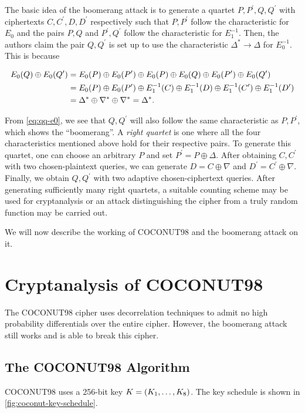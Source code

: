 \documentclass[twoside]{article}
\begin{document}
The basic idea of the boomerang attack is to generate a quartet \(P, P^\prime,
Q, Q^\prime\) with ciphertexts \(C, C^\prime, D, D^\prime\) respectively such
that \(P, P^\prime\) follow the characteristic for \(E_0\) and the pairs \(P,
Q\) and \(P^\prime, Q^\prime\) follow the characteristic for \(E_1^{-1}\). Then,
the authors claim the pair \(Q, Q^\prime\) is set up to use the characteristic
\(\Delta^* \rightarrow \Delta\) for \(E_0^{-1}\). This is because

\begin{align}
    E_0(Q) \oplus E_0(Q^\prime) &= E_0(P) \oplus E_0(P^\prime) \oplus E_0(P) \oplus E_0(Q) \oplus E_0(P^\prime) \oplus E_0(Q^\prime) \\
    &= E_0(P) \oplus E_0(P^\prime) \oplus E_1^{-1}(C) \oplus E_1^{-1}(D) \oplus E_1^{-1}(C^\prime) \oplus E_1^{-1}(D^\prime) \\
    &= \Delta^* \oplus \nabla^* \oplus \nabla^* = \Delta^*.
    \label{eq:qq-e0}
\end{align}

From \eqref{eq:qq-e0}, we see that \(Q, Q^\prime\) will also follow the same
characteristic as \(P, P^\prime\), which shows the ``boomerang''. A \emph{right
quartet} is one where all the four characteristics mentioned above hold for
their respective pairs. To generate this quartet, one can choose an arbitrary
\(P\) and set \(P^\prime = P \oplus \Delta\). After obtaining \(C, C^\prime\)
with two chosen-plaintext queries, we can generate \(D = C \oplus \nabla\) and
\(D^\prime = C^\prime \oplus \nabla\). Finally, we obtain \(Q, Q^\prime\) with
two adaptive chosen-ciphertext queries. After generating sufficiently many right
quartets, a suitable counting scheme may be used for cryptanalysis or an attack
distinguishing the cipher from a truly random function may be carried out.

We will now describe the working of COCONUT98 and the boomerang attack on it.

\section{Cryptanalysis of COCONUT98}
The COCONUT98 cipher uses decorrelation techniques to admit no high probability
differentials over the entire cipher. However, the boomerang attack still works
and is able to break this cipher.

\subsection{The COCONUT98 Algorithm}
COCONUT98 uses a 256-bit key \(K = (K_1, \ldots, K_8)\). The key schedule
is shown in \autoref{fig:coconut-key-schedule}.
\end{document}
